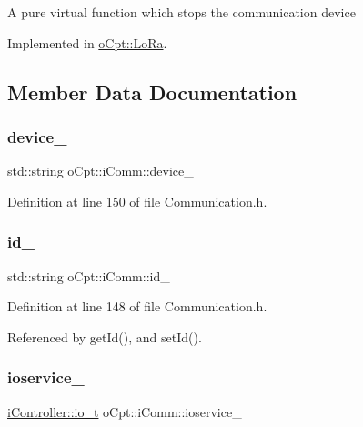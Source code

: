 A pure virtual function which stops the communication device 

Implemented in \hyperlink{classo_cpt_1_1_lo_ra_a8300de2590a7ce8b56863eb4059f14ad}{o\+Cpt\+::\+Lo\+Ra}.



\subsection{Member Data Documentation}
\hypertarget{classo_cpt_1_1i_comm_a26b537ee10eb14c0a15bb2ad4c4b7cda}{}\label{classo_cpt_1_1i_comm_a26b537ee10eb14c0a15bb2ad4c4b7cda} 
\subsubsection{\texorpdfstring{device\+\_\+}{device\_}}
{\footnotesize\ttfamily std\+::string o\+Cpt\+::i\+Comm\+::device\+\_\+\hspace{0.3cm}{\ttfamily [protected]}}



Definition at line 150 of file Communication.\+h.

\hypertarget{classo_cpt_1_1i_comm_a65678a6bfb2da392d2932b0cd5d818c6}{}\label{classo_cpt_1_1i_comm_a65678a6bfb2da392d2932b0cd5d818c6} 
\subsubsection{\texorpdfstring{id\+\_\+}{id\_}}
{\footnotesize\ttfamily std\+::string o\+Cpt\+::i\+Comm\+::id\+\_\+\hspace{0.3cm}{\ttfamily [protected]}}



Definition at line 148 of file Communication.\+h.



Referenced by get\+Id(), and set\+Id().

\hypertarget{classo_cpt_1_1i_comm_a40e1c5e7d35a83973c1b913da9143a2f}{}\label{classo_cpt_1_1i_comm_a40e1c5e7d35a83973c1b913da9143a2f} 
\subsubsection{\texorpdfstring{ioservice\+\_\+}{ioservice\_}}
{\footnotesize\ttfamily \hyperlink{classo_cpt_1_1i_controller_a51c3436b03060209f6cd2ddce6df2d0c}{i\+Controller\+::io\+\_\+t} o\+Cpt\+::i\+Comm\+::ioservice\+\_\+\hspace{0.3cm}{\ttfamily [protected]}}



